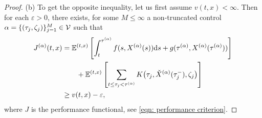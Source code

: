 \begin{proof}
    (b) To get the opposite inequality, let us first assume $v(t,x) < \infty$. Then for each $\varepsilon > 0$, there exists, for some $M \leq \infty$ a non-truncated control $\alpha= \{(\tau_j, \zeta_j)\}_{j=1}^M \in \mathcal{V}$ such that 
    \begin{align}
        J^{(\alpha)}(t,x) &= \mathbb{E}^{(t,x)} \left[\int_t^{\tau^{(\alpha)}} f(s, X^{(\alpha)}(s)) \mathrm{d} s + g(\tau^{(\alpha)}, X^{(\alpha)}(\tau^{(\alpha)}))\right] \nonumber \\
        & \qquad + \mathbb{E}^{(t,x)} \left[\sum_{t \leq \tau_j < \tau^{(\alpha)}} K\big(\tau_j, \check{X}^{(\alpha)}(\tau_j^-), \zeta_j \big)\right] \nonumber \nonumber\\
        & \geq v(t,x) - \varepsilon,
        \label{eqn: (10.1.5) in ØS}
    \end{align}
    where $J$ is the performance functional, see \eqref{eqn: performance criterion}. 


\end{proof}
